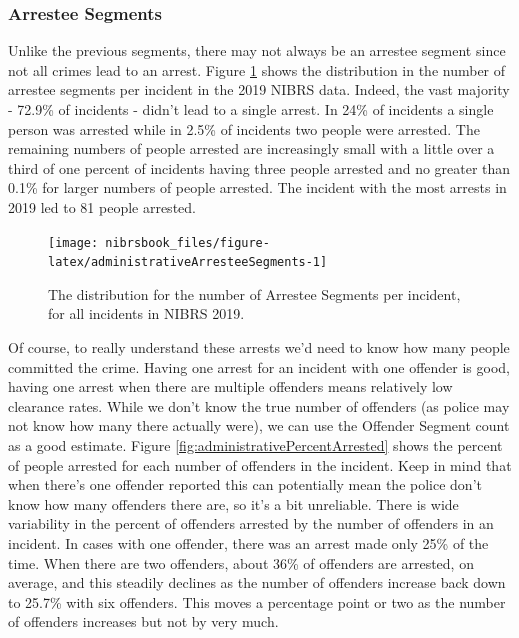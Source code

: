 \documentclass[
  12pt,
  openany]{book}
\begin{document}
\hypertarget{arrestee-segments}{%
\subsubsection{Arrestee Segments}\label{arrestee-segments}}

Unlike the previous segments, there may not always be an arrestee segment since not all crimes lead to an arrest. Figure \ref{fig:administrativeArresteeSegments} shows the distribution in the number of arrestee segments per incident in the 2019 NIBRS data. Indeed, the vast majority - 72.9\% of incidents - didn't lead to a single arrest. In 24\% of incidents a single person was arrested while in 2.5\% of incidents two people were arrested. The remaining numbers of people arrested are increasingly small with a little over a third of one percent of incidents having three people arrested and no greater than 0.1\% for larger numbers of people arrested. The incident with the most arrests in 2019 led to 81 people arrested.

\begin{figure}

{\centering \texttt{[image: nibrsbook\_files/figure-latex/administrativeArresteeSegments-1]} 

}

\caption{The distribution for the number of Arrestee Segments per incident, for all incidents in NIBRS 2019.}\label{fig:administrativeArresteeSegments}
\end{figure}

Of course, to really understand these arrests we'd need to know how many people committed the crime. Having one arrest for an incident with one offender is good, having one arrest when there are multiple offenders means relatively low clearance rates. While we don't know the true number of offenders (as police may not know how many there actually were), we can use the Offender Segment count as a good estimate. Figure \ref{fig:administrativePercentArrested} shows the percent of people arrested for each number of offenders in the incident. Keep in mind that when there's one offender reported this can potentially mean the police don't know how many offenders there are, so it's a bit unreliable. There is wide variability in the percent of offenders arrested by the number of offenders in an incident. In cases with one offender, there was an arrest made only 25\% of the time. When there are two offenders, about 36\% of offenders are arrested, on average, and this steadily declines as the number of offenders increase back down to 25.7\% with six offenders. This moves a percentage point or two as the number of offenders increases but not by very much.
\end{document}
